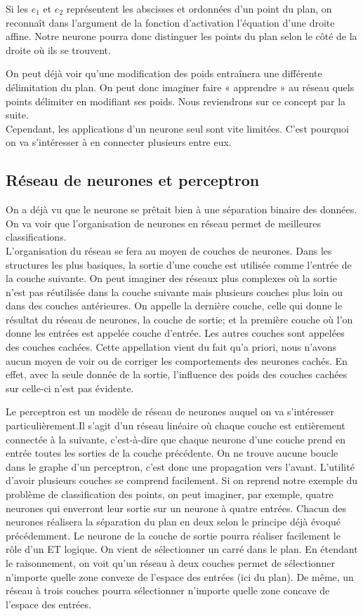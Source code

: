 Si les $e_1$ et $e_2$ représentent les abscisses et ordonnées d’un point du plan, on reconnaît dans l’argument de la fonction d’activation l’équation d’une droite affine. Notre neurone pourra donc distinguer les points du plan selon le côté de la droite où ils se trouvent.

On peut déjà voir qu’une modification des poids entraînera une différente délimitation du plan. On peut donc imaginer faire « apprendre » au réseau quels points délimiter en modifiant ses poids. Nous reviendrons sur ce concept par la suite.\\
Cependant, les applications d’un neurone seul sont vite limitées. C’est pourquoi on va s’intéresser à en connecter plusieurs entre eux.

\subsection{Réseau de neurones et perceptron} %
\label{sub:reseau_de_neurones}
On a déjà vu que le neurone se prêtait bien à une séparation binaire des données. On va voir que l’organisation de neurones en réseau permet de meilleures classifications.\\
L’organisation du réseau se fera au moyen de couches de neurones. 
Dans les structures les plus basiques, la sortie d'une couche est utilisée comme l'entrée de la couche suivante. On peut imaginer des réseaux plus complexes où la sortie n'est pas réutilisée dans la couche suivante mais plusieurs couches plus loin ou dans des couches antérieures.
On appelle la dernière couche, celle qui donne le résultat du réseau de neurones, la couche de sortie; et la première couche où l'on donne les entrées est appelée couche d'entrée. Les autres couches sont appelées des couches cachées. Cette appellation vient du fait qu’a priori, nous n’avons aucun moyen de voir ou de corriger les comportements des neurones cachés. En effet, avec la seule donnée de la sortie, l’influence des poids des couches cachées sur celle-ci n'est pas évidente.

Le perceptron est un modèle de réseau de neurones auquel on va s’intéresser particulièrement.Il s'agit d'un réseau linéaire où chaque couche est entièrement connectée à la suivante, c'est-à-dire que chaque neurone d'une couche prend en entrée toutes les sorties de la couche précédente. On ne trouve aucune boucle dans le graphe d'un perceptron, c'est donc une propagation vers l'avant.
L’utilité d’avoir plusieurs couches se comprend facilement. Si on reprend notre exemple du problème de classification des points, on peut imaginer, par exemple, quatre neurones qui enverront leur sortie sur un neurone à quatre entrées. Chacun des neurones réalisera la séparation du plan en deux selon le principe déjà évoqué précédemment. Le neurone de la couche de sortie pourra réaliser facilement le rôle d’un ET logique. On vient de sélectionner un carré dans le plan. En étendant le raisonnement, on voit qu’un réseau à deux couches permet de sélectionner n’importe quelle zone convexe de l’espace des entrées (ici du plan). De même, un réseau à trois couches pourra sélectionner n’importe quelle zone concave de l’espace des entrées.


